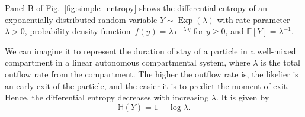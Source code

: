 \documentclass[smallextended]{svjour3}
\newcommand{\E}{\mathbb{E}}
\renewcommand{\H}{\mathbb{H}}
\newcommand{\Exp}{\operatorname{Exp}}
\newcommand{\pdf}{probability density function}
\begin{document}
Panel B of Fig.~\ref{fig:simple_entropy} shows the differential entropy of an exponentially distributed random variable $Y\sim\Exp(\lambda)$ with rate parameter $\lambda>0$, \pdf\ $f(y) = \lambda\,e^{-\lambda\,y}$ for $y\geq0$, and $\E\left[Y\right]=\lambda^{-1}$.

We can imagine it to represent the duration of stay of a particle in a well-mixed compartment in a linear autonomous compartmental system, where $\lambda$ is the total outflow rate from the compartment.
The higher the outflow rate is, the likelier is an early exit of the particle, and the easier it is to predict the moment of exit.
Hence, the differential entropy decreases with increasing $\lambda$.
It is given by
\begin{equation*}
	\H(Y) = 1-\log\lambda.
\end{equation*}
\end{document}

